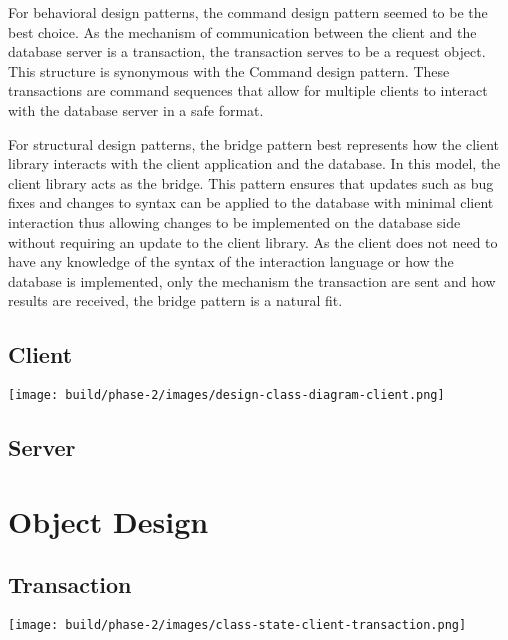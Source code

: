 \documentclass[a4paper]{report}
\begin{document}
	For behavioral design patterns, the command design pattern seemed to be the best choice. As the mechanism of communication between the client and the database server is a transaction, the transaction serves to be a request object. This structure is synonymous with the Command design pattern. These transactions are command sequences that allow for multiple clients to interact with the database server in a safe format.

	For structural design patterns, the bridge pattern best represents how the client library interacts with the client application and the database. In this model, the client library acts as the bridge. This pattern ensures that updates such as bug fixes and changes to syntax can be applied to the database with minimal client interaction thus allowing changes to be implemented on the database side without requiring an update to the client library. As the client does not need to have any knowledge of the syntax of the interaction language or how the database is implemented, only the mechanism the transaction are sent and how results are received, the bridge pattern is a natural fit.

	\section{Client}

		\begin{center}
			\texttt{[image: build/phase-2/images/design-class-diagram-client.png]}
		\end{center}

	\section{Server}

		\begin{center}
		\end{center}

\chapter{Object Design}

\section{Transaction}

	\begin{center}
		\texttt{[image: build/phase-2/images/class-state-client-transaction.png]}
	\end{center}
\end{document}
